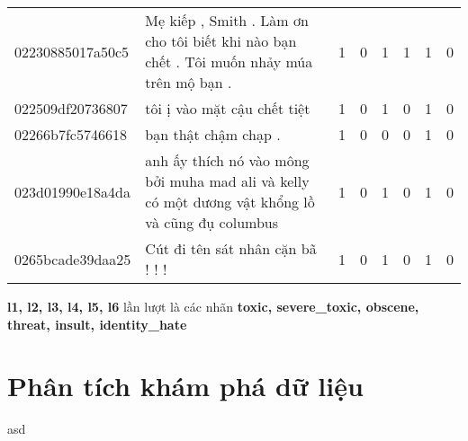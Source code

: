 \begin{sidewaystable}[htb!]
\begin{tabularx}{\textwidth}{L{0.8} L{6.6} C{0.1} C{0.1} C{0.1} C{0.1} C{0.1} C{0.1}}
        02230885017a50c5 & Mẹ kiếp , Smith . Làm ơn cho tôi biết khi nào bạn chết . Tôi muốn nhảy múa trên mộ bạn .                                          & 1           & 0           & 1           & 1           & 1           & 0           \\
        022509df20736807 & tôi ị vào mặt cậu chết tiệt                                                                                                       & 1           & 0           & 1           & 0           & 1           & 0           \\
        02266b7fc5746618 & bạn thật chậm chạp .                                                                                                              & 1           & 0           & 0           & 0           & 1           & 0           \\
        023d01990e18a4da & anh ấy thích nó vào mông bởi muha mad ali và kelly có một dương vật khổng lồ và cũng đụ columbus                                  & 1           & 0           & 1           & 0           & 1           & 0           \\
        0265bcade39daa25 & Cút đi tên sát nhân cặn bã ! ! !                                                                                                  & 1           & 0           & 1           & 0           & 1           & 0           \\
        \bottomrule
    \end{tabularx}
    {
    \fontsize{8pt}{12pt}\selectfont
    \textbf{l1, l2, l3, l4, l5, l6} lần lượt là các nhãn \textbf{toxic, severe\_toxic, obscene, threat, insult, identity\_hate}
    }
\end{sidewaystable}

\section*{Phân tích khám phá dữ liệu}
asd

